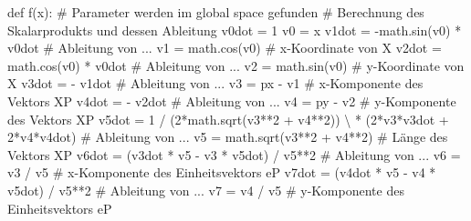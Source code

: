 \documentclass[
  a4paper,
  DIV=11]{scrreprt}
\newenvironment{Shaded}{\begin{snugshade}}{\end{snugshade}}
\newcommand{\CommentTok}[1]{\textcolor[rgb]{0.37,0.37,0.37}{#1}}
\newcommand{\DecValTok}[1]{\textcolor[rgb]{0.68,0.00,0.00}{#1}}
\newcommand{\KeywordTok}[1]{\textcolor[rgb]{0.00,0.23,0.31}{#1}}
\newcommand{\NormalTok}[1]{\textcolor[rgb]{0.00,0.23,0.31}{#1}}
\newcommand{\OperatorTok}[1]{\textcolor[rgb]{0.37,0.37,0.37}{#1}}
\theoremstyle{definition}
\theoremstyle{definition}
\theoremstyle{remark}
\begin{document}
\begin{tcolorbox}
\begin{Shaded}
\begin{Highlighting}[]
\KeywordTok{def}\NormalTok{ f(x):}
    \CommentTok{\# Parameter werden im global space gefunden}
    \CommentTok{\# Berechnung des Skalarprodukts und dessen Ableitung}
\NormalTok{    v0dot }\OperatorTok{=} \DecValTok{1}
\NormalTok{    v0 }\OperatorTok{=}\NormalTok{ x}
\NormalTok{    v1dot }\OperatorTok{=} \OperatorTok{{-}}\NormalTok{math.sin(v0) }\OperatorTok{*}\NormalTok{ v0dot  }\CommentTok{\# Ableitung von ...}
\NormalTok{    v1 }\OperatorTok{=}\NormalTok{ math.cos(v0)  }\CommentTok{\# x{-}Koordinate von X}
\NormalTok{    v2dot }\OperatorTok{=}\NormalTok{ math.cos(v0) }\OperatorTok{*}\NormalTok{ v0dot   }\CommentTok{\# Ableitung von ...}
\NormalTok{    v2 }\OperatorTok{=}\NormalTok{ math.sin(v0)  }\CommentTok{\# y{-}Koordinate von X}
\NormalTok{    v3dot }\OperatorTok{=} \OperatorTok{{-}}\NormalTok{ v1dot    }\CommentTok{\# Ableitung von ...}
\NormalTok{    v3 }\OperatorTok{=}\NormalTok{ px }\OperatorTok{{-}}\NormalTok{ v1       }\CommentTok{\# x{-}Komponente des Vektors XP}
\NormalTok{    v4dot }\OperatorTok{=} \OperatorTok{{-}}\NormalTok{ v2dot    }\CommentTok{\# Ableitung von ...}
\NormalTok{    v4 }\OperatorTok{=}\NormalTok{ py }\OperatorTok{{-}}\NormalTok{ v2       }\CommentTok{\# y{-}Komponente des Vektors XP}
\NormalTok{    v5dot }\OperatorTok{=} \DecValTok{1} \OperatorTok{/}\NormalTok{ (}\DecValTok{2}\OperatorTok{*}\NormalTok{math.sqrt(v3}\OperatorTok{**}\DecValTok{2} \OperatorTok{+}\NormalTok{ v4}\OperatorTok{**}\DecValTok{2}\NormalTok{)) }\OperatorTok{\textbackslash{}}
        \OperatorTok{*}\NormalTok{ (}\DecValTok{2}\OperatorTok{*}\NormalTok{v3}\OperatorTok{*}\NormalTok{v3dot }\OperatorTok{+} \DecValTok{2}\OperatorTok{*}\NormalTok{v4}\OperatorTok{*}\NormalTok{v4dot)  }\CommentTok{\# Ableitung von ...}
\NormalTok{    v5 }\OperatorTok{=}\NormalTok{ math.sqrt(v3}\OperatorTok{**}\DecValTok{2} \OperatorTok{+}\NormalTok{ v4}\OperatorTok{**}\DecValTok{2}\NormalTok{)  }\CommentTok{\# Länge des Vektors XP}
\NormalTok{    v6dot }\OperatorTok{=}\NormalTok{ (v3dot }\OperatorTok{*}\NormalTok{ v5 }\OperatorTok{{-}}\NormalTok{ v3 }\OperatorTok{*}\NormalTok{ v5dot) }\OperatorTok{/}\NormalTok{ v5}\OperatorTok{**}\DecValTok{2}  \CommentTok{\# Ableitung von ...}
\NormalTok{    v6 }\OperatorTok{=}\NormalTok{ v3 }\OperatorTok{/}\NormalTok{ v5       }\CommentTok{\# x{-}Komponente des Einheitsvektors eP}
\NormalTok{    v7dot }\OperatorTok{=}\NormalTok{ (v4dot }\OperatorTok{*}\NormalTok{ v5 }\OperatorTok{{-}}\NormalTok{ v4 }\OperatorTok{*}\NormalTok{ v5dot) }\OperatorTok{/}\NormalTok{ v5}\OperatorTok{**}\DecValTok{2}  \CommentTok{\# Ableitung von ...}
\NormalTok{    v7 }\OperatorTok{=}\NormalTok{ v4 }\OperatorTok{/}\NormalTok{ v5       }\CommentTok{\# y{-}Komponente des Einheitsvektors eP}

\end{Highlighting}
\end{Shaded}
\end{tcolorbox}
\end{document}

